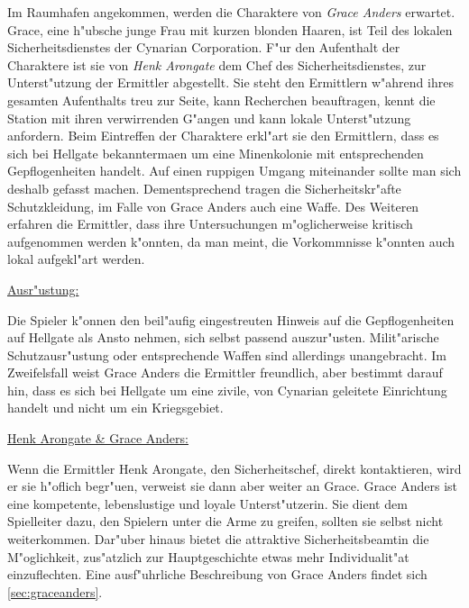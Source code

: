 Im Raumhafen angekommen, werden die Charaktere von \emph{Grace Anders} erwartet. Grace, eine h"ubsche junge Frau mit kurzen blonden Haaren, ist Teil des lokalen Sicherheitsdienstes der Cynarian Corporation. F"ur den Aufenthalt der Charaktere ist sie von \emph{Henk Arongate} dem Chef des Sicherheitsdienstes, zur Unterst"utzung der Ermittler abgestellt. Sie steht den Ermittlern w"ahrend ihres gesamten Aufenthalts treu zur Seite, kann Recherchen beauftragen, kennt die Station mit ihren verwirrenden G"angen und kann lokale Unterst"utzung anfordern. Beim Eintreffen der Charaktere erkl"art sie den Ermittlern, dass es sich bei Hellgate bekannterma\3en um eine Minenkolonie mit entsprechenden Gepflogenheiten handelt. Auf einen ruppigen Umgang miteinander sollte man sich deshalb gefasst machen. Dementsprechend tragen die Sicherheitskr"afte Schutzkleidung, im Falle von Grace Anders auch eine Waffe. Des Weiteren erfahren die Ermittler, dass ihre Untersuchungen m"oglicherweise kritisch aufgenommen werden k"onnten, da man meint, die Vorkommnisse k"onnten auch lokal aufgekl"art werden.

\begin{remarks}
	\underline{Ausr"ustung:}

	Die Spieler k"onnen den beil"aufig eingestreuten Hinweis auf die Gepflogenheiten auf Hellgate als Ansto\3 nehmen, sich selbst passend auszur"usten. Milit"arische Schutzausr"ustung oder entsprechende Waffen sind allerdings unangebracht. Im Zweifelsfall weist Grace Anders die Ermittler freundlich, aber bestimmt darauf hin, dass es sich bei Hellgate um eine zivile, von Cynarian geleitete Einrichtung handelt und nicht um ein Kriegsgebiet.

	\underline{Henk Arongate \& Grace Anders:}
	
	Wenn die Ermittler Henk Arongate, den Sicherheitschef, direkt kontaktieren, wird er sie h"oflich begr"u\3en, verweist sie dann aber weiter an Grace. Grace Anders ist eine kompetente, lebenslustige und loyale Unterst"utzerin. Sie dient dem Spielleiter dazu, den Spielern unter die Arme zu greifen, sollten sie selbst nicht weiterkommen. Dar"uber hinaus bietet die attraktive Sicherheitsbeamtin die M"oglichkeit, zus"atzlich zur Hauptgeschichte etwas mehr Individualit"at einzuflechten. Eine ausf"uhrliche Beschreibung von Grace Anders findet sich \cref{sec:graceanders}.
\end{remarks}


